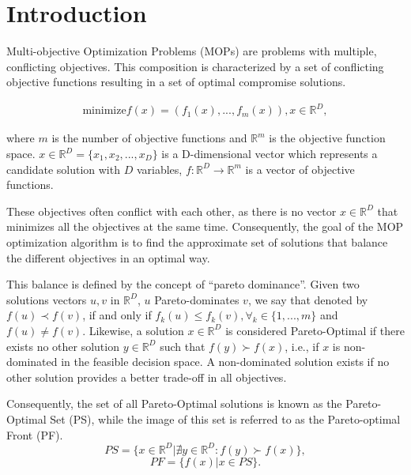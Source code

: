 \section{Introduction}

Multi-objective Optimization Problems (MOPs) are problems with multiple, conflicting objectives. This composition is characterized by a set of conflicting objective functions resulting in a set of optimal compromise solutions. 


\vspace{-1em}
\begin{align}\label{min_problem}
\text{minimize} f(x) = (f_1(x), ..., f_{m}(x)), \text{$x \in \mathbb{R}^{D}$},
\end{align}

where $m$ is the number of objective functions and $\mathbb{R}^m$ is the objective function space. $x \in \mathbb{R}^{D} = \{x_1, x_2, ..., x_D\}$ is a D-dimensional vector which represents a candidate solution with ${D}$ variables, $f: \mathbb{R}^{D} \rightarrow \mathbb{R}^{m}$ is a vector of objective functions.%

These objectives often conflict with each other, as there is no vector $x \in \mathbb{R}^{D}$ that minimizes all the objectives at the same time. Consequently, the goal of the MOP optimization algorithm is to find the approximate set of solutions that balance the different objectives in an optimal way.

This balance is defined by the concept of ``pareto dominance''. Given two solutions vectors $u, v$ in $\mathbb{R}^{D}$, $u$  Pareto-dominates $v$, we say that denoted by $f(u) \prec f(v)$, if and only if $f_k(u) \leq f_k(v), \forall_k \in \{1,..., m\}$ and $ f(u) \neq f(v)$. Likewise, a solution $x \in \mathbb{R}^{D}$ is considered Pareto-Optimal if there exists no other solution $y \in \mathbb{R}^{D}$ such that $f(y) \succ f(x)$, i.e., if $x$ is non-dominated in the feasible decision space. A non-dominated solution exists if no other solution provides a better trade-off in all objectives. 

Consequently, the set of all Pareto-Optimal solutions is known as the Pareto-Optimal Set (PS), while the image of this set is referred to as the Pareto-optimal Front (PF).\\
\vspace{-1em}
\begin{equation}
PS = \{x \in \mathbb{R}^{D} | \nexists y \in \mathbb{R}^{D} : f(y) \succ f(x)  \},
\end{equation}
\vspace{-1em}
\begin{equation}
PF = \{f(x) | x \in PS \}.
\end{equation}

